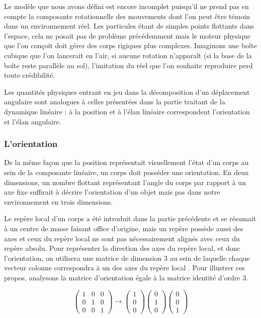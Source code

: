 Le modèle que nous avons défini est encore incomplet puisqu'il ne
prend pas en compte la composante rotationnelle des mouvements dont
l'on peut être témoin dans un environnement réel. Les particules étant
de simples points flottants dans l'espace, cela ne posait pas de
problème précédemment mais le moteur physique que l'on conçoit doit
gérer des corps rigiques plus complexes. Imaginons une boîte cubique
que l'on lancerait en l'air, si aucune rotation n'apparaît (si la base
de la boîte reste parallèle au sol), l'imitation du réel que l'on
souhaite reproduire perd toute crédibilité.

Les quantités physiques entrant en jeu dans la décomposition d'un
déplacement angulaire sont analogues à celles présentées dans la
partie traitant de la dynamique linéaire : à la position et à l'élan
linéaire correspondent l'orientation et l'élan angulaire.

\subsubsection{L'orientation}

De la même façon que la position représentait visuellement l'état d'un
corps au sein de la composante linéaire, un corps doit posséder une
orientation. En deux dimensions, un nombre flottant représentant
l'angle du corps par rapport à un axe fixe suffirait à décrire
l'orientation d'un objet mais pas dans notre environnement en trois
dimensions.

Le repère local d'un corps a été introduit dans la partie précédente
et se résumait à un centre de masse faisant office d'origine, mais un
repère possède aussi des axes et ceux du repère local ne sont pas
nécessairement alignés avec ceux du repère absolu. Pour représenter la
direction des axes du repère local, et donc l'orientation, on
utilisera une matrice de dimension 3 au sein de laquelle chaque
vecteur colonne correspondra à un des axes du repère local
\cite{witkit97}. Pour illustrer ces propos, analysons la matrice
d'orientation égale à la matrice identité d'ordre 3.

\[
\begin{pmatrix}
  1 & 0 & 0 \\ 0 & 1 & 0 \\ 0 & 0 & 1
\end{pmatrix}
\rightarrow
\begin{pmatrix}
  1 \\ 0 \\ 0
\end{pmatrix}
\begin{pmatrix}
  0 \\ 1 \\ 0
\end{pmatrix}
\begin{pmatrix}
  0 \\ 0 \\ 1
\end{pmatrix}
\]

